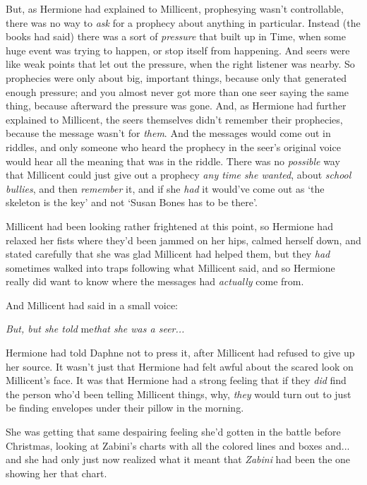 But, as Hermione had explained to Millicent, prophesying wasn't
controllable, there was no way to \emph{ask} for a prophecy about
anything in particular. Instead (the books had said) there was a sort of
\emph{pressure} that built up in Time, when some huge event was trying
to happen, or stop itself from happening. And seers were like weak
points that let out the pressure, when the right listener was nearby. So
prophecies were only about big, important things, because only that
generated enough pressure; and you almost never got more than one seer
saying the same thing, because afterward the pressure was gone. And, as
Hermione had further explained to Millicent, the seers themselves didn't
remember their prophecies, because the message wasn't for \emph{them}.
And the messages would come out in riddles, and only someone who heard
the prophecy in the seer's original voice would hear all the meaning
that was in the riddle. There was no \emph{possible} way that Millicent
could just give out a prophecy \emph{any time she wanted}, about
\emph{school bullies}, and then \emph{remember} it, and if she
\emph{had} it would've come out as `the skeleton is the key' and not
`Susan Bones has to be there'.

Millicent had been looking rather frightened at this point, so Hermione
had relaxed her fists where they'd been jammed on her hips, calmed
herself down, and stated carefully that she was glad Millicent had
helped them, but they \emph{had} sometimes walked into traps following
what Millicent said, and so Hermione really did want to know where the
messages had \emph{actually} come from.

And Millicent had said in a small voice:

\emph{But, but she told} me\emph{that she was a seer...}

Hermione had told Daphne not to press it, after Millicent had refused to
give up her source. It wasn't just that Hermione had felt awful about
the scared look on Millicent's face. It was that Hermione had a strong
feeling that if they \emph{did} find the person who'd been telling
Millicent things, why, \emph{they} would turn out to just be finding
envelopes under their pillow in the morning.

She was getting that same despairing feeling she'd gotten in the battle
before Christmas, looking at Zabini's charts with all the colored lines
and boxes and... and she had only just now realized what it meant
that \emph{Zabini} had been the one showing her that chart.

